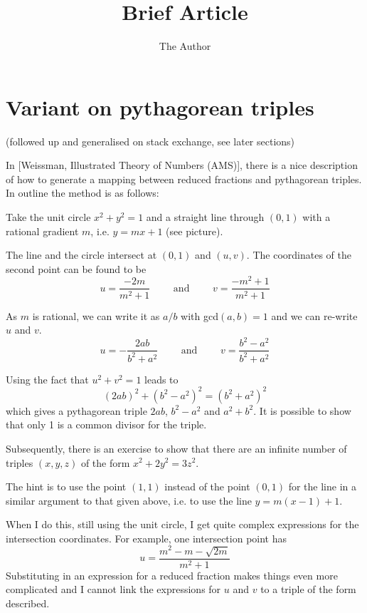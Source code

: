 \documentclass[11pt]{amsart}
\title{Brief Article}
\author{The Author}
\begin{document}
\section{Variant on pythagorean triples}

(followed up and generalised on stack exchange, see later sections)

In [Weissman, Illustrated Theory of Numbers (AMS)], there is a nice description of how to generate a mapping between reduced fractions and pythagorean triples.
In outline the method is as follows:

Take the unit circle $x^2+y^2=1$ and a straight line through $(0,1)$ with a rational gradient $m$, i.e. $y = mx + 1$ (see picture).

The  line  and the circle intersect at $(0,1)$ and $(u,v)$. The coordinates of the second point can be found to be 
$$
u = \frac{- 2 m}{{{m}^{2}}+1} \qquad 
\text{ and }
\qquad
v = \frac{{ - {m}^{2}} + 1}{{{m}^{2}}+1}
$$

As $m$ is rational, we can write it as $a/b$ with gcd$(a,b)=1$ and we can re-write $u$ and $v$.
$$
u = -\frac{2 a b}{{{b}^{2}}+{{a}^{2}}}
\qquad 
\text{ and }
\qquad
v = \frac{{{b}^{2}}-{{a}^{2}}}{{{b}^{2}}+{{a}^{2}}}
$$

Using the fact that $u^2+v^2 = 1$ leads to
$$
(2ab)^2 + (b^2-a^2)^2 = (b^2 + a^2)^2
$$
which gives a pythagorean triple $2ab$, $b^2-a^2$ and $a^2+b^2$. It is possible to show that only 1 is a common divisor for the triple.

Subsequently, there is an exercise to show that there are an infinite number of triples $(x,y,z)$ of the form $x^2 + 2 y^2 = 3 z^2$.

The hint is to use the point $(1,1)$ instead of the point $(0,1)$ for the line in a similar argument to that given above, i.e. to use the line $y = m(x-1) + 1$.

When I do this, still using the unit circle, I get quite complex expressions for the intersection coordinates. For example, one intersection point has
\[u = \frac{{{m}^{2}} - m -  \sqrt{2m}}{{{m}^{2}}+1}\]
Substituting in an expression for a reduced fraction makes things even more complicated and I cannot link the expressions for $u$ and $v$ to a triple of the form described.
\end{document}
